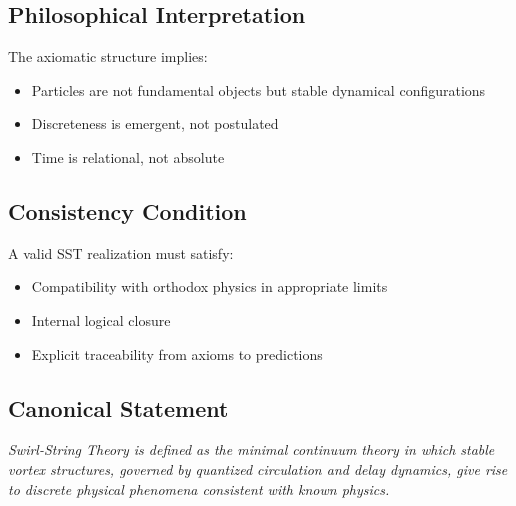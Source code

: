 \documentclass[11pt]{article}
\theoremstyle{definition}
\theoremstyle{plain}
\theoremstyle{remark}
\begin{document}
    \subsection{Philosophical Interpretation}
        
        The axiomatic structure implies:
        
        \begin{itemize}
            \item Particles are not fundamental objects but stable dynamical configurations
            \item Discreteness is emergent, not postulated
            \item Time is relational, not absolute
        \end{itemize}
    
    \subsection{Consistency Condition}
        
        A valid SST realization must satisfy:
        
        \begin{itemize}
            \item Compatibility with orthodox physics in appropriate limits
            \item Internal logical closure
            \item Explicit traceability from axioms to predictions
        \end{itemize}
    
    \subsection{Canonical Statement}
        
        \begin{center}
            \textit{
                Swirl-String Theory is defined as the minimal continuum theory in which stable vortex structures, governed by quantized circulation and delay dynamics, give rise to discrete physical phenomena consistent with known physics.
            }
        \end{center}

        
\end{document}
